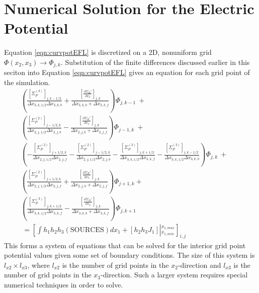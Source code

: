 \documentclass[11pt,letterpaper]{article}
\begin{document}


\section{Numerical Solution for the Electric Potential}

Equation \ref{eqn:curvpotEFL} is discretized on a 2D, nonuniform grid $\Phi(x_2,x_3) \rightarrow \Phi_{j,k}$.   Substitution of the finite differences discussed earlier in this seciton into Equation \ref{eqn:curvpotEFL} gives an equation for each grid point of the simulation.
\begin{eqnarray}
 \left( \frac{ \left[ \Sigma_P^{(3)} \right]_{j,k-1/2}}{\Delta x_{3,k,1/2} \Delta x_{3,k,b}} + \frac{ \left[ \frac{\partial \Sigma_H'}{\partial x_2} \right]_{j,k}}{\Delta x_{3,k,b} + \Delta x_{3,k,f}} \right) \Phi_{j,k-1} ~ + &~& \nonumber \\
 \left( \frac{ \left[ \Sigma_P^{(2)} \right]_{j-1/2,k} }{\Delta x_{2,j,1/2} \Delta x_{2,j,b}} - \frac{ \left[ \frac{\partial \Sigma_H'}{\partial x_3} \right]_{j,k}}{\Delta x_{2,j,b} + \Delta x_{2,j,f}}\right) \Phi_{j-1,k} ~ + &~& \nonumber \\
 \left( - \frac{ \left[ \Sigma_P^{(2)} \right]_{j+1/2,k}} {\Delta x_{2,j,1/2} \Delta x_{2,j,f}} - \frac{ \left[ \Sigma_P^{(2)}\right]_{j-1/2,k} }{\Delta x_{2,j,1/2} \Delta x_{2,j,b}} - \frac{ \left[ \Sigma_P^{(3)} \right]_{j,k+1/2}} {\Delta x_{3,k,1/2} \Delta x_{3,k,f}} - \frac{ \left[ \Sigma_P^{(3)}\right]_{j,k-1/2} }{\Delta x_{3,k,1/2} \Delta x_{3,k,b}}  \right) \Phi_{j,k} ~ + &~& \nonumber \\
 \left( \frac{ \left[ \Sigma_P^{(2)} \right]_{j+1/2,k} }{\Delta x_{2,j,1/2} \Delta x_{2,j,f}} + \frac{\left[ \frac{\partial \Sigma_H'}{\partial x_3} \right]_{j,k}}{\Delta x_{2,j,b} + \Delta x_{2,j,f} }\right) \Phi_{j+1,k} + &~& \nonumber \\
 \left( \frac{ \left[ \Sigma_P^{(3)} \right]_{j,k+1/2}}{\Delta x_{3,k,1/2} \Delta x_{3,k,f}} - \frac{ \left[ \frac{\partial \Sigma_H'}{\partial x_2} \right]_{j,k}}{\Delta x_{3,k,b} + \Delta x_{3,k,f}} \right) \Phi_{j,k+1} ~ &~& \nonumber \\ 
 ~ = \left[ \int h_1 h_2 h_3 \left( \mathrm{SOURCES} \right) d x_1 + \left[ h_2 h_3 J_1 \right] \left|^{x_{1,max}}_{x_{1,min}} \right. \right]_{i,j}
\label{eqn:FDE}
\end{eqnarray}
This forms a system of equations that can be solved for the interior grid point potential values given some set of boundary conditions.  The size of this system is $l_{x2} \times l_{x3}$, where $l_{x2}$ is the number of grid points in the $x_2$-direction and $l_{x3}$ is the number of grid points in the $x_3$-direction.  Such a larger system requires special numerical techniques in order to solve.  
\end{document}
